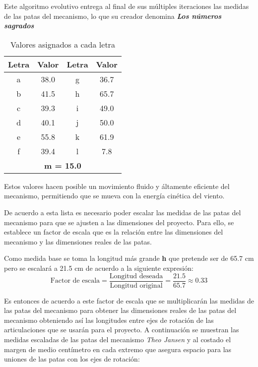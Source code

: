 Este algoritmo evolutivo entrega al final de sus múltiples iteraciones las medidas de las patas del mecanismo, lo que su creador denomina \textbf{\textit{Los números sagrados}}

\begin{table}[H]
  \centering
  \caption{Valores asignados a cada letra}
  \begin{tabular}{cc|cc}
    \toprule
    \textbf{Letra} & \textbf{Valor} & \textbf{Letra} & \textbf{Valor} \\
    \midrule
    a & 38.0 & g & 36.7 \\
    b & 41.5 & h & 65.7 \\
    c & 39.3 & i & 49.0 \\
    d & 40.1 & j & 50.0 \\
    e & 55.8 & k & 61.9 \\
    f & 39.4 & l & 7.8 \\
    \multicolumn{4}{c}{\textbf{m = 15.0}} \\
    \bottomrule
  \end{tabular}
\end{table}

Estos valores hacen posible un movimiento fluido y áltamente eficiente del mecanismo, permitiendo que se mueva con la energía cinética del viento.

De acuerdo a esta lista es necesario poder escalar las medidas de las patas del mecanismo para que se ajusten a las dimensiones del proyecto. Para ello, se establece un factor de escala que es la relación entre las dimensiones del mecanismo y las dimensiones reales de las patas.

Como medida base se toma la longitud más grande \textbf{h} que pretende ser de 65.7 cm pero se escalará a 21.5 cm de acuerdo a la siguiente expresión:
\begin{equation}
  \text{Factor de escala} = \frac{\text{Longitud deseada}}{\text{Longitud original}} = \frac{21.5}{65.7} \approx 0.33
\end{equation}

Es entonces de acuerdo a este factor de escala que se multiplicarán las medidas de las patas del mecanismo para obtener las dimensiones reales de las patas del mecanismo obteniendo así las longitudes entre ejes de rotación de las articulaciones que se usarán para el proyecto. A continuación se muestran las medidas escaladas de las patas del mecanismo \textit{Theo Jansen} y al costado el margen de medio centímetro en cada extremo que asegura espacio para las uniones de las patas con los ejes de rotación:

